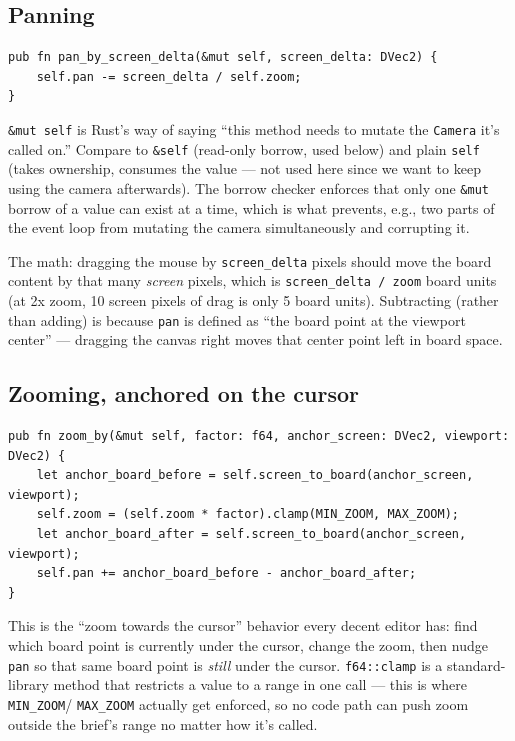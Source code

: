 \documentclass[11pt]{article}
\begin{document}
\subsection{Panning}
\begin{lstlisting}
pub fn pan_by_screen_delta(&mut self, screen_delta: DVec2) {
    self.pan -= screen_delta / self.zoom;
}
\end{lstlisting}
\texttt{\&mut self} is Rust's way of saying ``this method needs to mutate the
\texttt{Camera} it's called on.'' Compare to \texttt{\&self} (read-only borrow, used
below) and plain \texttt{self} (takes ownership, consumes the value — not used here since
we want to keep using the camera afterwards). The borrow checker enforces that only one
\texttt{\&mut} borrow of a value can exist at a time, which is what prevents, e.g., two
parts of the event loop from mutating the camera simultaneously and corrupting it.

The math: dragging the mouse by \texttt{screen\_delta} pixels should move the board content
by that many \emph{screen} pixels, which is \texttt{screen\_delta / zoom} board units (at
2x zoom, 10 screen pixels of drag is only 5 board units). Subtracting (rather than adding)
is because \texttt{pan} is defined as ``the board point at the viewport center'' — dragging
the canvas right moves that center point left in board space.

\subsection{Zooming, anchored on the cursor}
\begin{lstlisting}
pub fn zoom_by(&mut self, factor: f64, anchor_screen: DVec2, viewport: DVec2) {
    let anchor_board_before = self.screen_to_board(anchor_screen, viewport);
    self.zoom = (self.zoom * factor).clamp(MIN_ZOOM, MAX_ZOOM);
    let anchor_board_after = self.screen_to_board(anchor_screen, viewport);
    self.pan += anchor_board_before - anchor_board_after;
}
\end{lstlisting}
This is the ``zoom towards the cursor'' behavior every decent editor has: find which board
point is currently under the cursor, change the zoom, then nudge \texttt{pan} so that same
board point is \emph{still} under the cursor. \texttt{f64::clamp} is a standard-library
method that restricts a value to a range in one call — this is where \texttt{MIN\_ZOOM}/
\texttt{MAX\_ZOOM} actually get enforced, so no code path can push zoom outside the brief's
range no matter how it's called.
\end{document}
